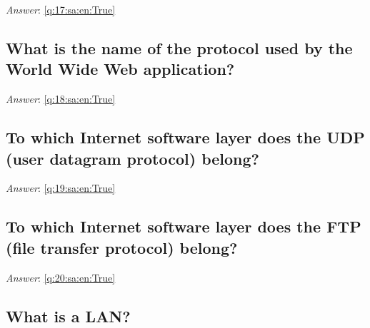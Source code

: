 \documentclass[a4paper,11pt,oneside]{article}
\begin{document}
\begin{sloppypar}
\textit{Answer}: \autoref{q:17:sa:en:True}



\subsection{What is the name of the protocol used by the World Wide Web application?}

\label{q:18:sa:en:False}

\vspace{2cm}

\noindent\makebox[\textwidth]{\hrulefill}

\vspace{1cm}

\textit{Answer}: \autoref{q:18:sa:en:True}



\subsection{To which Internet software layer does the UDP (user datagram protocol) belong?}

\label{q:19:sa:en:False}

\vspace{2cm}

\noindent\makebox[\textwidth]{\hrulefill}

\vspace{1cm}

\textit{Answer}: \autoref{q:19:sa:en:True}



\subsection{To which Internet software layer does the FTP (file transfer protocol) belong?}

\label{q:20:sa:en:False}

\vspace{2cm}

\noindent\makebox[\textwidth]{\hrulefill}

\vspace{1cm}

\textit{Answer}: \autoref{q:20:sa:en:True}



\subsection{What is a LAN?}


\end{sloppypar}
\end{document}
